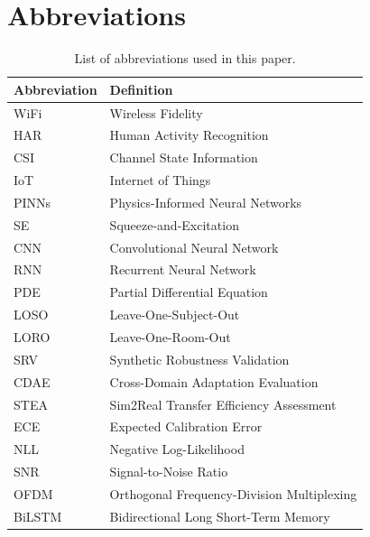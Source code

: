\documentclass[journal]{IEEEtran}
\begin{document}
\section{Abbreviations}
\begin{table}[h]
\centering
\caption{List of abbreviations used in this paper.}
\label{tab:abbreviations}
\small
\begin{tabular}{@{}ll@{}}
\toprule
\textbf{Abbreviation} & \textbf{Definition} \\
\midrule
WiFi & Wireless Fidelity \\
HAR & Human Activity Recognition \\
CSI & Channel State Information \\
IoT & Internet of Things \\
PINNs & Physics-Informed Neural Networks \\
SE & Squeeze-and-Excitation \\
CNN & Convolutional Neural Network \\
RNN & Recurrent Neural Network \\
PDE & Partial Differential Equation \\
LOSO & Leave-One-Subject-Out \\
LORO & Leave-One-Room-Out \\
SRV & Synthetic Robustness Validation \\
CDAE & Cross-Domain Adaptation Evaluation \\
STEA & Sim2Real Transfer Efficiency Assessment \\
ECE & Expected Calibration Error \\
NLL & Negative Log-Likelihood \\
SNR & Signal-to-Noise Ratio \\
OFDM & Orthogonal Frequency-Division Multiplexing \\
BiLSTM & Bidirectional Long Short-Term Memory \\
\bottomrule
\end{tabular}
\end{table}



\end{document}
